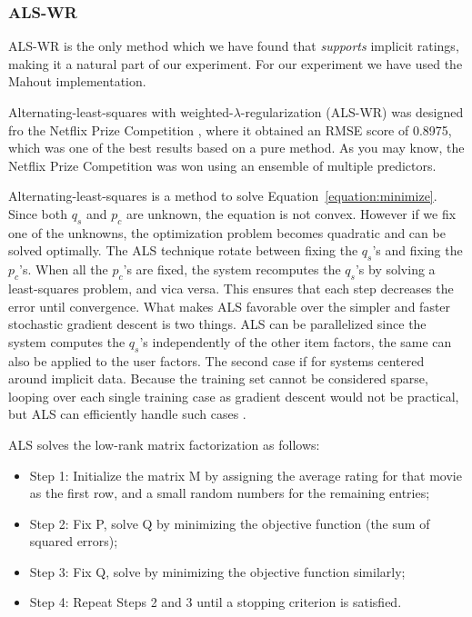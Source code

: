 \subsubsection{ALS-WR}


ALS-WR is the only method which we have found that \emph{supports} implicit ratings, making
it a natural part of our experiment. For our experiment we have used the Mahout \cite{mahout} implementation.

Alternating-least-squares with weighted-$\lambda$-regularization (ALS-WR) was designed fro the Netflix Prize
Competition \cite{Netflix}, where it obtained an RMSE score of 0.8975, which was one of the best results based
on a pure method. As you may know, the Netflix Prize Competition was won using an ensemble of multiple predictors.

Alternating-least-squares is a method to solve Equation~\ref{equation:minimize}. Since both $q_{s}$ and $p_{c}$
are unknown, the equation is not convex. However if we fix one of the unknowns, the optimization problem becomes
quadratic and can be solved optimally. The ALS technique rotate between fixing the $q_{s}$'s and fixing the $p_{c}$'s.
When all the $p_{c}$'s are fixed, the system recomputes the $q_{s}$'s by solving a least-squares problem, and vica versa.
This ensures that each step decreases the error until convergence. What makes ALS favorable over the simpler and faster
stochastic gradient descent is two things. ALS can be parallelized since the system computes the $q_{s}$'s independently
of the other item factors, the same can also be applied to the user factors. The second case if for systems centered around
implicit data. Because the training set cannot be considered sparse, looping over each single training case as gradient descent
would not be practical, but ALS can efficiently handle such cases \cite{Hu2008}.\newline

ALS solves the low-rank matrix factorization as follows:

\begin{itemize}
\item Step 1: Initialize the matrix M by assigning the average rating for that movie as the first row, and a small random numbers for the remaining entries;
\item Step 2: Fix P, solve Q by minimizing the objective function (the sum of squared errors);
\item Step 3: Fix Q, solve by minimizing the objective function similarly;
\item Step 4: Repeat Steps 2 and 3 until a stopping criterion is satisfied.
\end{itemize}

